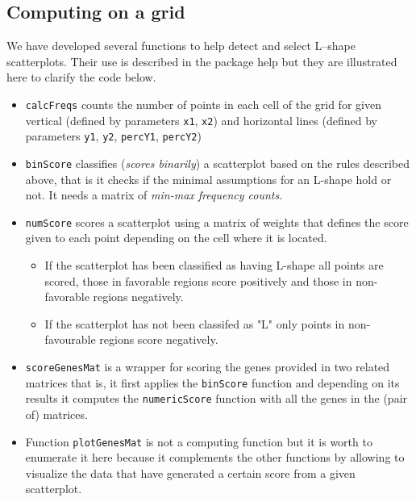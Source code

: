 \documentclass[a4paper,10pt]{article}\usepackage[]{graphicx}\usepackage[]{color}
\begin{document}
\subsection{Computing on a grid}

We have developed several functions to help detect and select L--shape scatterplots.
Their use is described in the package help but they are illustrated here to clarify the code below.

\begin{itemize}
\item \texttt{calcFreqs} counts the number of points in each cell of the grid for given vertical (defined by parameters \texttt{x1}, \texttt{x2}) and horizontal lines (defined by parameters \texttt{y1}, \texttt{y2}, \texttt{percY1}, \texttt{percY2}) 
\item \texttt{binScore} classifies (\emph{scores binarily}) a scatterplot based on the rules described above, that is it checks if the minimal assumptions for an L-shape hold or not. It needs a matrix of \emph{min-max frequency counts}.
\item \texttt{numScore} scores a scatterplot using a matrix of weights that defines the score given to each point depending on the cell where it is located. 
\begin{itemize}
  \item If the scatterplot has been classified as having L-shape all points are scored, those in favorable regions score positively and those in non-favorable regions negatively. 
  \item If the scatterplot has not been classifed as "L" only points in non-favourable regions score negatively. 
\end{itemize}
\item \texttt{scoreGenesMat} is a wrapper for scoring the genes provided in two related matrices that is, it first applies the \texttt{binScore} function and depending on its results it computes the \texttt{numericScore} function with all the genes in the (pair of) matrices.
\item Function \texttt{plotGenesMat} is not a computing function but it is worth to enumerate it here because it complements the other functions by allowing to visualize the data that have generated a certain score from a given scatterplot.
\end{itemize}
\end{document}

